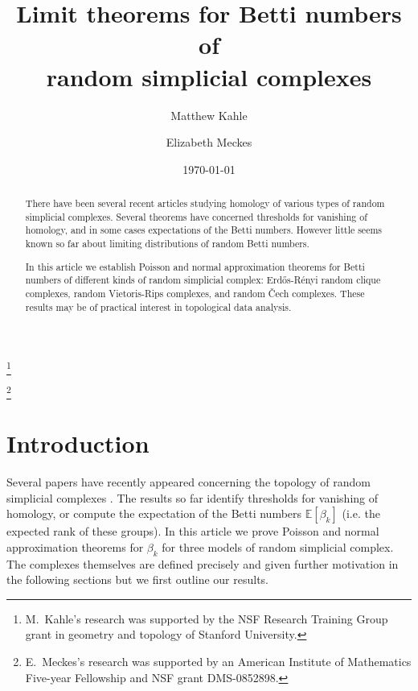 \documentclass{amsart}
\theoremstyle{definition}
\newcommand{\E}{\mathbb{E}}
\renewcommand{\1}{\mathbb{1}}
\begin{document}
\title[Limit theorems for Betti numbers]{Limit theorems for Betti
  numbers of \\random simplicial complexes} \author{Matthew Kahle}
\thanks{M.\ Kahle's research was supported by the NSF Research
  Training Group grant in geometry and topology of Stanford
  University.}  \address{School of Mathematics, Institute for Advanced
  Study, Einstein Drive, Princeton NJ 08540, U.S.A.}
 \author{Elizabeth Meckes}
\thanks{E.\ Meckes's research was supported by an American Institute of
  Mathematics Five-year Fellowship and NSF grant DMS-0852898.}
\address{Case Western Reserve University, Cleveland, OH 44106, U.S.A.}
 \date{\today}

\maketitle

\begin{abstract}
There have been several recent articles studying homology of various
types of random simplicial complexes.  Several theorems have concerned
thresholds for vanishing of homology, and in some cases expectations
of the Betti numbers.  However little seems known so far about
limiting distributions of random Betti numbers.
   
In this article we establish Poisson and normal approximation theorems for Betti numbers of different kinds of random simplicial complex: Erd\H{o}s-R\'enyi random clique complexes, random Vietoris-Rips complexes, and random \v{C}ech complexes.  These results may be of practical interest in topological data analysis.

\end{abstract}

\section{Introduction}

Several papers have recently appeared concerning the topology of
random simplicial complexes \cite{clique, bhk, neighborhood, Linial,
Meshulam, triangulated, geometric}.  The results so far identify
thresholds for vanishing of homology, or compute the
expectation of the Betti numbers $\E[\beta_k]$ (i.e. the expected rank
of these groups).  In this article we prove Poisson and normal
approximation theorems for $\beta_k$ for three models of random
simplicial complex. The complexes themselves are defined precisely
and given further motivation in the following sections but we first outline our
results.
 
\end{document}
